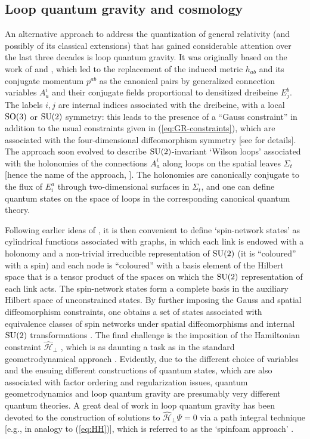 \documentclass[12pt]{iopart}
\def\eref#1{(\ref{eq:#1})}
\begin{document}
\subsection{\label{sec:lqc}Loop quantum gravity and cosmology}
An alternative approach to address the quantization of general relativity (and possibly of its classical extensions) that has gained considerable attention over the last three decades is loop quantum gravity. It was originally based on the work of \citet{Sen:1982qb} and \citet{Ashtekar:1986yd}, which led to the replacement of the induced metric $h_{ab}$ and its conjugate momentum $p^{ab}$ as the canonical pairs by generalized connection variables $A^i_a$ and their conjugate fields proportional to densitized dreibeine $E^b_j$. The labels $i,j$ are internal indices associated with the dreibeine, with a local ${\rm SO}(3)$ or ${\rm SU}(2)$ symmetry: this leads to the presence of a ``Gauss constraint'' in addition to the usual constraints given in \eref{GR-constraints}, which are associated with the four-dimensional diffeomorphism symmetry [see \citet{Rovelli:2004tv,Kiefer:book} for details]. The approach soon evolved to describe ${\rm SU}(2)$-invariant `Wilson loops' associated with the holonomies of the connections $A^i_a$ along loops on the spatial leaves $\Sigma_t$ [hence the name of the approach, \citep{Rovelli:1989za}]. The holonomies are canonically conjugate to the flux of $E^a_i$ through two-dimensional surfaces in $\Sigma_t$, and one can define quantum states on the space of loops in the corresponding canonical quantum theory.

Following earlier ideas of \citet{Penrose:spin}, it is then convenient to define `spin-network states' as cylindrical functions associated with graphs, in which each link is endowed with a holonomy and a non-trivial irreducible representation of ${\rm SU}(2)$ (it is ``coloured'' with a spin) and each node is ``coloured'' with a basis element of the Hilbert space that is a tensor product of the spaces on which the ${\rm SU}(2)$ representation of each link acts. The spin-network states form a complete basis in the auxiliary Hilbert space of unconstrained states. By further imposing the Gauss and spatial diffeomorphism constraints, one obtains a set of states associated with equivalence classes of spin networks under spatial diffeomorphisms and internal ${\rm SU}(2)$ transformations \citep{Thiemann:2007pyv}. The final challenge is the imposition of the Hamiltonian constraint $\hat{\mathcal{H}}_{\perp}$ \citep{Thiemann:1996ay}, which is as daunting a task as in the standard geometrodynamical approach \citep{Kiefer:book}. Evidently, due to the different choice of variables and the ensuing different constructions of quantum states, which are also associated with factor ordering and regularization issues, quantum geometrodynamics and loop quantum gravity are presumably very different quantum theories. A great deal of work in loop quantum gravity has been devoted to the construction of solutions to $\hat{\mathcal{H}}_{\perp}\Psi = 0$ via a path integral technique [e.g., in analogy to \eref{HH}], which is referred to as the `spinfoam approach' \citep{Nicolai:2005mc,Perez:2006gja,Rovelli:2014ssa}. 
\end{document}
